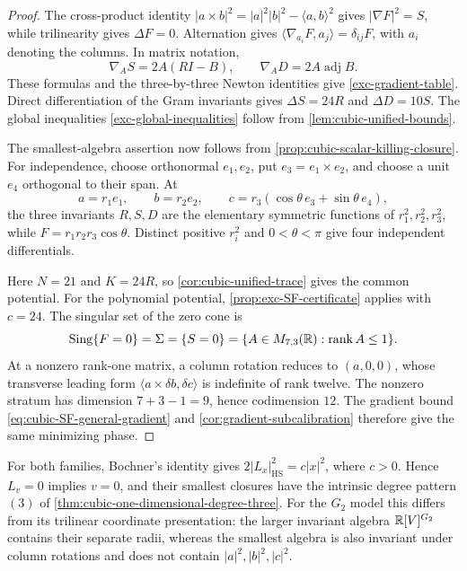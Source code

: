 \begin{proof}
The cross-product identity
\(|a\times b|^2=|a|^2|b|^2-\langle a,b\rangle^2\)
gives \(|\nabla F|^2=S\), while trilinearity gives
\(\Delta F=0\). Alternation gives
\(\langle\nabla_{a_i}F,a_j\rangle=\delta_{ij}F\), with
\(a_i\) denoting the columns. In matrix notation,
\[
 \nabla_A S=2A(RI-B),\qquad
 \nabla_A D=2A\operatorname{adj}B.
\]
These formulas and the three-by-three Newton identities give
\eqref{exc-gradient-table}. Direct differentiation of the Gram
invariants gives \(\Delta S=24R\) and \(\Delta D=10S\).
The global inequalities \eqref{exc-global-inequalities} follow
from \cref{lem:cubic-unified-bounds}.

The smallest-algebra assertion now follows from
\cref{prop:cubic-scalar-killing-closure}.
For independence,
choose orthonormal \(e_1,e_2\), put \(e_3=e_1\times e_2\),
and choose a unit \(e_4\) orthogonal to their span. At
\[
 a=r_1e_1,\qquad b=r_2e_2,\qquad
 c=r_3(\cos\theta\,e_3+\sin\theta\,e_4),
\]
the three invariants \(R,S,D\) are the elementary symmetric
functions of \(r_1^2,r_2^2,r_3^2\), while
\(F=r_1r_2r_3\cos\theta\). Distinct positive \(r_i^2\)
and \(0<\theta<\pi\) give four independent differentials.

Here \(N=21\) and \(K=24R\), so
\cref{cor:cubic-unified-trace} gives the common potential.
For the polynomial potential, \cref{prop:exc-SF-certificate} applies
with \(c=24\). The singular set of the zero cone is
\[
 \operatorname{Sing}\{F=0\}=\Sigma=\{S=0\}
 =\{A\in M_{7,3}(\mathbb R):\operatorname{rank}A\leq1\}.
\]
At a nonzero rank-one matrix, a column rotation reduces to
\((a,0,0)\), whose transverse leading form
\(\langle a\times\delta b,\delta c\rangle\) is indefinite of rank twelve.
The nonzero stratum has dimension
\(7+3-1=9\), hence codimension \(12\). The gradient bound
\eqref{eq:cubic-SF-general-gradient} and \cref{cor:gradient-subcalibration}
therefore give the same minimizing phase.
\end{proof}

\begin{remark}
For both families, Bochner's identity gives
\(2|L_x|_{\mathrm{HS}}^2=c|x|^2\), where \(c>0\). Hence
\(L_v=0\) implies \(v=0\), and their smallest closures have the intrinsic
degree pattern \((3)\) of \cref{thm:cubic-one-dimensional-degree-three}.
For the \(G_2\) model this differs from its trilinear coordinate
presentation: the larger invariant algebra
\(\mathbb R[V]^{G_2}\) contains their separate radii, whereas the
smallest algebra is also invariant under column rotations and
does not contain \(|a|^2,|b|^2,|c|^2\).
\end{remark}
